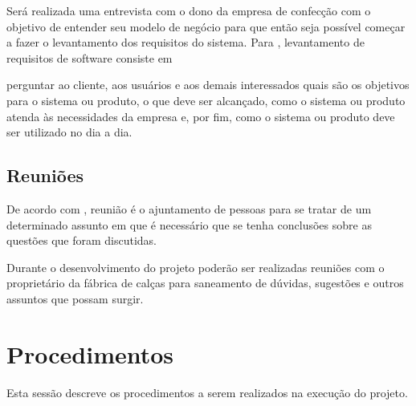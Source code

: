 


\par Será realizada uma entrevista com o dono da empresa de confecção com o
objetivo de entender seu modelo de negócio para que então seja possível começar
a fazer o levantamento dos requisitos do sistema. Para
, levantamento de requisitos de
software consiste em

\begin{citacao}
perguntar ao cliente, aos usuários e aos demais interessados quais são os
objetivos para o sistema ou produto, o que deve ser alcançado, como o sistema ou
produto atenda às necessidades da empresa e, por fim, como o sistema ou produto
deve ser utilizado no dia a dia.
\end{citacao} 


\subsection{Reuniões}
\par De acordo com , reunião é o ajuntamento de
pessoas para se tratar de um determinado assunto em que é necessário que se
tenha conclusões sobre as questões que foram discutidas.

\par Durante o desenvolvimento do projeto poderão ser realizadas reuniões
com o proprietário da fábrica de calças para saneamento de dúvidas, sugestões e
outros assuntos que possam surgir.

\section{Procedimentos}

\par Esta sessão descreve os procedimentos a serem realizados na execução do
projeto.

